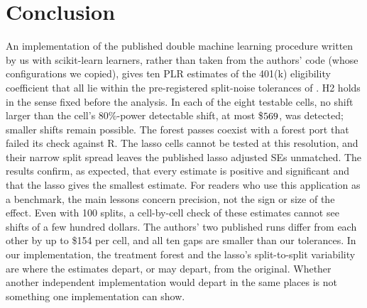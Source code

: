 \documentclass[11pt]{article}
\begin{document}
\section{Conclusion}
\label{sec:conclusion}

An implementation of the published double machine learning procedure written by us with
scikit-learn learners, rather than taken from the authors' code (whose configurations we
copied), gives ten PLR estimates of the
401(k) eligibility coefficient that all lie within the pre-registered split-noise
tolerances of \citet[Table~2, Panel~B]{chernozhukov2018dml}. H2 holds in the sense fixed
before the analysis. In each of the eight testable cells, no shift larger than the
cell's 80\%-power detectable shift, at most \$$569$, was detected; smaller
shifts remain possible. The forest passes coexist with a forest port that failed its
check against R. The lasso cells cannot be tested at this resolution, and their narrow
split spread leaves the published lasso adjusted SEs unmatched. The results confirm, as
expected, that every estimate is positive and significant and that the lasso gives the
smallest estimate. For readers who use this application as a benchmark, the main lessons
concern precision, not the sign or size of the effect. Even with 100 splits, a
cell-by-cell check of these estimates cannot see shifts of a few hundred dollars. The
authors' two published runs differ from each other by up to \$154 per cell, and all ten
gaps are smaller than our tolerances. In our implementation, the treatment forest and the lasso's
split-to-split variability are where the estimates depart, or may depart, from the
original. Whether another independent implementation would depart in the same places is
not something one implementation can show.





\end{document}
